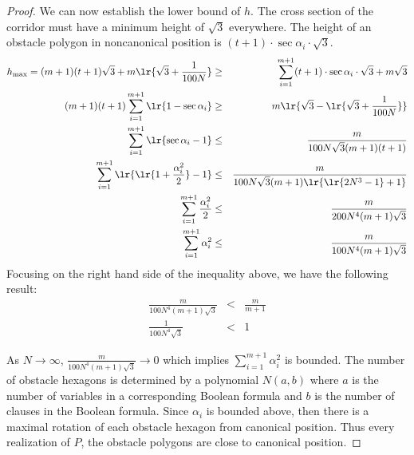 \begin{proof}
We can now establish the lower bound of $h$. 
The cross section of the corridor must have a minimum height of $\sqrt{3}$ everywhere.
The height of an obstacle polygon in noncanonical position is $(t+1) \cdot \sec \alpha_i \cdot \sqrt{3}$.
\begin{eqnarray*}
h_\text{max} = (m+1) (t+1) \sqrt{3} + m \lr{\sqrt{3}+ \frac{1}{100N}}&\geq& \sum_{i = 1}^{m+1} (t+1) \cdot \sec \alpha_i \cdot \sqrt{3} + m \sqrt{3}\\
(m+1) (t+1) \sum_{i = 1}^{m+1} \lr{1 - \sec \alpha_i}&\geq& m \lr{\sqrt{3} - \lr{\sqrt{3}+ \frac{1}{100N}}}\\
\sum_{i = 1}^{m+1} \lr{ \sec \alpha_i - 1} &\leq& \frac{m}{100 N \sqrt{3} (m+1)(t+1) }\\
\sum_{i = 1}^{m+1} \lr{ \lr{1 + \frac{\alpha_i^2}{2}} - 1} &\leq&\frac{m}{100 N \sqrt{3} (m+1)\lr{\lr{2N^3 - 1}+1} }\\
\sum_{i = 1}^{m+1} \frac{\alpha_i^2}{2} &\leq&\frac{m}{200 N^4 (m+1) \sqrt{3} } \\
\sum_{i = 1}^{m+1} \alpha_i^2 &\leq& \frac{m}{100N^4 (m+1) \sqrt{3}}
\end{eqnarray*}
Focusing on the right hand side of the inequality above, we have the following result:
\begin{eqnarray*}
\frac{m}{100N^4 (m+1) \sqrt{3}} &<& \frac{m}{m+1}\\
\frac{1}{100N^4 \sqrt{3}}&<& 1
\end{eqnarray*}

As $N \rightarrow \infty$, $\frac{m}{100N^4 (m+1) \sqrt{3}} \rightarrow 0$ which implies $\sum_{i = 1}^{m+1} \alpha_i^2$ is bounded.  
The number of obstacle hexagons is determined by a polynomial $N(a,b)$ where $a$ is the number of variables in a corresponding Boolean formula and $b$ is the number of clauses in the Boolean formula.
Since $\alpha_i$ is bounded above, then there is a maximal rotation of each obstacle hexagon from canonical position.
Thus every realization of $P$, the obstacle polygons are close to canonical position.







\end{proof}
